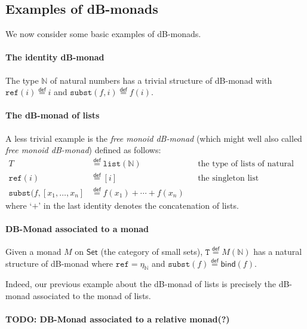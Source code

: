 \documentclass[a4paper,twoside,12pt]{article}
\theoremstyle{definition}
\theoremstyle{remark}
\newcommand{\NN}{\mathbb{N}}
\newcommand{\subst}{\mathtt{subst}}
\newcommand{\refe}{\mathtt{ref}}
\newcommand{\TT}{\mathtt{T}}
\begin{document}
\subsection{Examples of dB-monads}
\label{sec:examples-dB-monads}

We now consider some basic examples of dB-monads.

\paragraph{The identity dB-monad}

The type $\NN$ of natural numbers has a trivial structure of dB-monad
with $\refe(i) \stackrel{\mathsf{def}}{=} i$ and
$\subst(f,i) \stackrel{\mathsf{def}}{=} f(i)$.

\paragraph{The dB-monad of lists}

A less trivial example is the \emph{free monoid dB-monad} (which might
well also called \emph{free monoid dB-monad}) defined as follows:
\begin{align*}
T &\stackrel{\mathsf{def}}{=}\mathtt{list}(\NN) && \text{the type of lists of natural numbers} \\
\refe(i) &\stackrel{\mathsf{def}}{=} [i] &&\text{the singleton list} \\
\subst(f,[x_1, \dots, x_n] &\stackrel{\mathsf{def}}{=} f(x_1) + \cdots + f(x_n)
\end{align*}
where `$+$' in the last identity denotes the concatenation of lists.

\paragraph{DB-Monad associated to a monad}

Given a monad $M$ on $\mathsf{Set}$ (the category of small sets),
$\TT \stackrel{\mathsf{def}}{=} M(\NN)$ has a natural structure of
dB-monad where $\refe = \eta_\NN$ and
$\subst(f) \stackrel{\mathsf{def}}{=} \mathsf{bind}(f)$.

Indeed, our previous example about the dB-monad of lists is precisely
the dB-monad associated to the monad of lists.

\paragraph{TODO: DB-Monad associated to a relative monad(?)}
\end{document}
